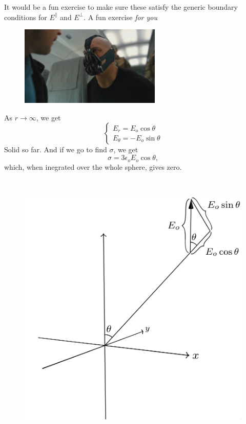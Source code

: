 \documentclass{article}
\begin{document}
It would be a fun exercise to make sure these satisfy the generic boundary conditions for $E^{\parallel}$ and $E^{\perp}$. A fun exercise \emph{for you}

\begin{figure}[H]
\centering
\includegraphics[width=0.6\textwidth]{figures/bane.jpeg}
\end{figure}

\begin{minipage}{0.5\textwidth}
As $r \to \infty$, we get
\begin{equation*}
    \begin{cases} E_r = E_o \cos{\theta} \\[1em] E_{\theta} = -E_o \sin{\theta} \end{cases}
\end{equation*}
Solid so far. And if we go to find $\sigma$, we get
\begin{equation*}
    \sigma = 3\epsilon_o E_o \cos{\theta},
\end{equation*}
which, when inegrated over the whole sphere, gives zero.
\end{minipage}
~
\begin{minipage}{0.4\textwidth}
\begin{figure}[H]
\centering
    \includegraphics[width=\textwidth]{figures/6l8.png}
\end{figure}
\end{minipage}
\end{document}
